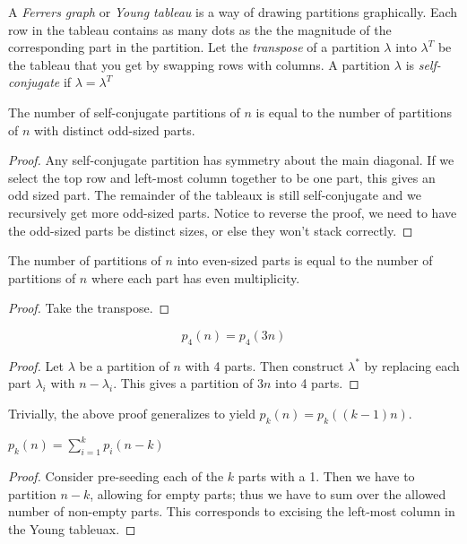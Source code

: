 A \textit{Ferrers graph} or \textit{Young tableau} is a way of drawing partitions graphically.
Each row in the tableau contains as many dots as the the magnitude of the corresponding part in the partition. 
Let the \textit{transpose} of a partition $\lambda$ into $\lambda^T$ be the tableau that
you get by swapping rows with columns. A partition $\lambda$ is \textit{self-conjugate} if $\lambda = \lambda^T$
\begin{theorem}
    The number of self-conjugate partitions of $n$ is equal to the number of partitions of $n$ with distinct odd-sized parts.
\end{theorem}
\begin{proof}
    Any self-conjugate partition has symmetry about the main diagonal. If
we select the top row and left-most column together to be one part, this gives
an odd sized part. The remainder of the tableaux is still self-conjugate and we
recursively get more odd-sized parts. Notice to reverse the proof, we need to
have the odd-sized parts be distinct sizes, or else they won't stack correctly.
\end{proof}
\begin{theorem}
    The number of partitions of $n$ into even-sized parts is equal to the number
of partitions of $n$ where each part has even multiplicity.
\end{theorem}
\begin{proof}
    Take the transpose.
\end{proof}
\begin{theorem}
    \[ p_4(n) = p_4(3n)\]
\end{theorem}
\begin{proof}
    Let $\lambda$ be a partition of $n$ with 4 parts. Then construct $\lambda^*$
    by replacing each part $\lambda_i$ with $n-\lambda_i$. This gives a partition of $3n$ into 4 parts. 
\end{proof}

Trivially, the above proof generalizes to yield $p_k(n) = p_k((k - 1)n)$.
\begin{theorem}
    $p_k(n) = \sum_{i=1}^k p_i(n-k)$
\end{theorem}
\begin{proof}
    Consider pre-seeding each of the $k$ parts with a 1. Then we have to partition $n-k$, 
    allowing for empty parts; thus we have to sum over the allowed
number of non-empty parts. This corresponds to excising the left-most column
in the Young tableuax.
\end{proof}